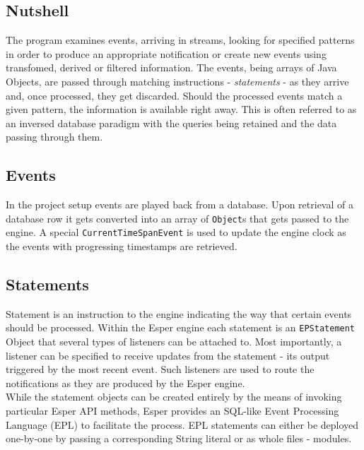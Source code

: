 \subsection{Nutshell}
The program examines events, arriving in streams, looking for specified patterns in order to produce an appropriate notification or create new events using transfomed, 
	derived or filtered information.
The events, being arrays of Java Objects, are passed through matching instructions - \emph{statements} - as they arrive and, once processed, they get discarded.
Should the processed events match a given pattern, the information is available right away. 
This is often referred to as an inversed database paradigm with the queries being retained and the data passing through them.

\subsection{Events}
In the project setup events are played back from a database. Upon retrieval of a database row it gets converted into an array of \texttt{Object}s that gets passed to the engine. 
A special \texttt{CurrentTimeSpanEvent} is used to update the engine clock as the events with progressing timestamps are retrieved.

\subsection{Statements}
Statement is an instruction to the engine indicating the way that certain events should be processed. Within the Esper engine each statement is an \texttt{EPStatement} Object that several types of 
listeners can be attached to. Most importantly, a listener can be specified to receive updates from the statement - its output triggered by the most recent event. Such listeners are used to route the
notifications as they are produced by the Esper engine. \\
While the statement objects can be created entirely by the means of invoking particular Esper API methods, Esper provides an SQL-like Event Processing Language (EPL) to facilitate the process.
EPL statements can either be deployed one-by-one by passing a corresponding String literal or as whole files - modules.

